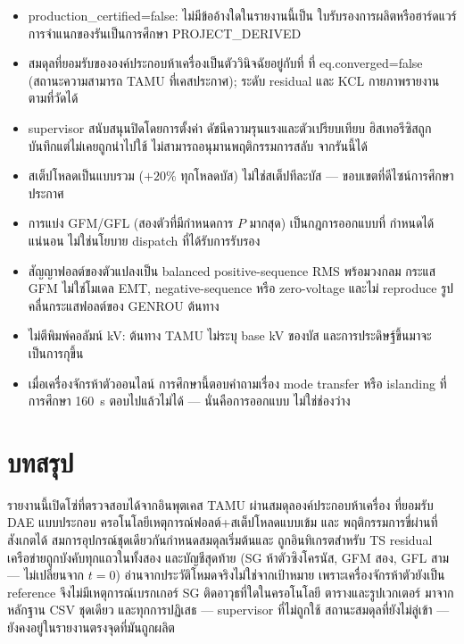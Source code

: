 \documentclass[12pt,a4paper]{article}
\newcommand{\code}[1]{{\ttfamily\small\hyphenchar\font=-1 #1}}
\begin{document}
\begin{itemize}
\item \code{production\_certified=false}: ไม่มีข้ออ้างใดในรายงานนี้เป็น
      ใบรับรองการผลิตหรือฮาร์ดแวร์ การจำแนกของรันเป็นการศึกษา PROJECT\_DERIVED
\item สมดุลที่ยอมรับขององค์ประกอบห้าเครื่องเป็นตัววินิจฉัยอยู่กับที่
      ที่ \code{eq.converged=false} (สถานะความสามารถ TAMU ที่เคสประกาศ);
      ระดับ residual และ KCL กายภาพรายงานตามที่วัดได้
\item supervisor สนับสนุนปิดโดยการตั้งค่า ดัชนีความรุนแรงและตัวเปรียบเทียบ
      ฮิสเทอรีซิสถูกบันทึกแต่ไม่เคยถูกนำไปใช้ ไม่สามารถอนุมานพฤติกรรมการสลับ
      จากรันนี้ได้
\item สเต็ปโหลดเป็นแบบรวม ($+20\%$ ทุกโหลดบัส) ไม่ใช่สเต็ปทีละบัส
      — ขอบเขตที่ดีไซน์การศึกษาประกาศ
\item การแบ่ง GFM/GFL (สองตัวที่มีกำหนดการ $P$ มากสุด) เป็นกฎการออกแบบที่
      กำหนดได้แน่นอน ไม่ใช่นโยบาย dispatch ที่ได้รับการรับรอง
\item สัญญาฟอลต์ของตัวแปลงเป็น balanced positive-sequence RMS พร้อมวงกลม
      กระแส GFM ไม่ใช่โมเดล EMT, negative-sequence หรือ zero-voltage
      และไม่ reproduce รูปคลื่นกระแสฟอลต์ของ GENROU ต้นทาง
\item ไม่ตีพิมพ์คอลัมน์ kV: ต้นทาง TAMU ไม่ระบุ base kV ของบัส
      และการประดิษฐ์ขึ้นมาจะเป็นการกุขึ้น
\item เมื่อเครื่องจักรห้าตัวออนไลน์ การศึกษานี้ตอบคำถามเรื่อง mode transfer
      หรือ islanding ที่การศึกษา 160~s ตอบไปแล้วไม่ได้ — นั่นคือการออกแบบ
      ไม่ใช่ช่องว่าง
\end{itemize}

\section{บทสรุป}

รายงานนี้เปิดโซ่ที่ตรวจสอบได้จากอินพุตเคส TAMU ผ่านสมดุลองค์ประกอบห้าเครื่อง
ที่ยอมรับ DAE แบบประกอบ ครอโนโลยีเหตุการณ์ฟอลต์+สเต็ปโหลดแบบเข้ม และ
พฤติกรรมการขี่ผ่านที่สังเกตได้ สมการอุปกรณ์ชุดเดียวกันกำหนดสมดุลเริ่มต้นและ
ถูกอินทิเกรตสำหรับ TS residual เครือข่ายถูกบังคับทุกแถวในทั้งสอง
และบัญชีสุดท้าย (SG ห้าตัวซิงโครนัส, GFM สอง, GFL สาม — ไม่เปลี่ยนจาก $t=0$)
อ่านจากประวัติโหมดจริงไม่ใช่จากเป้าหมาย เพราะเครื่องจักรห้าตัวยังเป็น reference
จึงไม่มีเหตุการณ์เบรกเกอร์ SG ติดอาวุธที่ใดในครอโนโลยี ตารางและรูปเวกเตอร์
มาจากหลักฐาน CSV ชุดเดียว และทุกการปฏิเสธ — supervisor ที่ไม่ถูกใช้
สถานะสมดุลที่ยังไม่ลู่เข้า — ยังคงอยู่ในรายงานตรงจุดที่มันถูกผลิต
\end{document}
